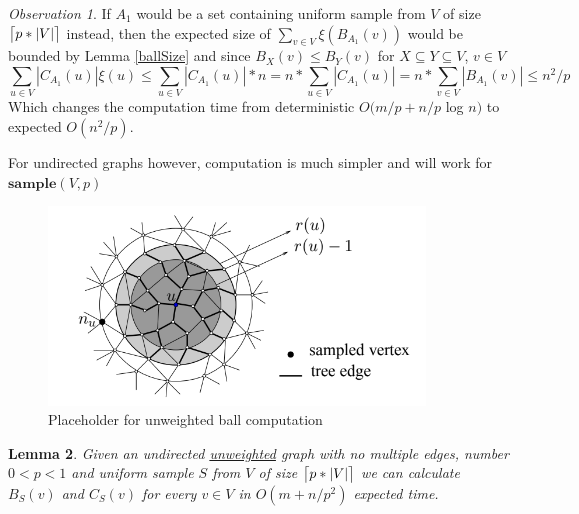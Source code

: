\documentclass[shortabstract, lic, english]{iithesis}
\theoremstyle{definition} \newtheorem{definition}{Definition}[chapter]
\theoremstyle{remark} \newtheorem{remark}[definition]{Observation}
\theoremstyle{plain} \newtheorem{theorem}[definition]{Theorem}
\theoremstyle{plain} \newtheorem{lemma}[definition]{Lemma}
\theoremstyle{plain} \newtheorem{conjecture}[definition]{Conjecture}
\DeclarePairedDelimiter{\ceil}{\lceil}{\rceil}
\begin{document}
\begin{remark} \label{ballClustersForUniformSample}
    If $A_1$ would be a set containing uniform sample from $V$ of size $\ceil[\big]{p * |V|}$ instead, then the expected size of $\sum_{v \in V} \xi(B_{A_1}(v))$ would be bounded by Lemma \ref{ballSize} and since $B_X(v) \leq B_Y(v)$ for $X \subseteq Y \subseteq V$, $v \in V$
    $$\sum_{u \in V} |C_{A_1}(u)|\xi(u) \leq \sum_{u \in V} |C_{A_1}(u)| * n = n * \sum_{u \in V} |C_{A_1}(u)| = n * \sum_{v \in V} |B_{A_1}(v)| \leq n^2/p$$
    Which changes the computation time from deterministic $O(m/p + n/p $ log $n) $ to expected $O(n^2/p)$.
\end{remark}

For undirected graphs however, computation is much simpler and will work for
$\mathbf{sample}(V, p)$

\begin{figure}[h]
    \includegraphics[width=10cm]{images/placeholder_unweightedball}
    \centering
    \caption{Placeholder for unweighted ball computation}
\end{figure}

\begin{lemma} \label{ballClusterUnweighted}
    Given an undirected \underline{unweighted} graph with no multiple edges, number $0 < p < 1$ and
    uniform sample $S$ from $V$ of size $\ceil[\big]{p * |V|}$
    we can calculate $B_{S}(v)$ and $C_{S}(v)$ for every $v \in V$ in $O(m + n/p^2)$ expected time.
\end{lemma}
\end{document}
